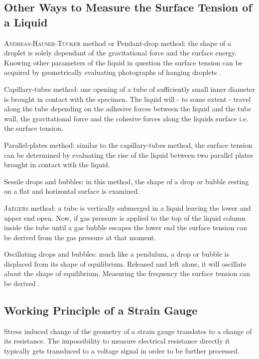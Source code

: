         \subsection*{Other Ways to Measure the Surface Tension of a Liquid}
            \textsc{Andreas-Hauser-Tucker} method or Pendant-drop method: the shape of a droplet is solely dependant of the
            gravitational force and the surface energy. Knowing other parameters of the liquid in question the surface tension
            can be acquired by geometrically evaluating photographs of hanging droplets \cite{Andreas-Hauser-Tucker.surface.tension.pendant.drop.1938}.\par
            Capillary-tubes method: one opening of a tube of sufficiently small inner diameter is brought in contact with
            the specimen. The liquid will - to some extent - travel along the tube depending on the adhesive forces between
            the liquid and the tube wall, the gravitational force and the cohesive forces along the liquids surface i.e.
            the surface tension.\par
            Parallel-plates method: similar to the capillary-tubes method, the surface tension can be determined by evaluating
            the rise of the liquid between two parallel plates brought in contact with the liquid.\par
            Sessile drops and bubbles: in this method, the shape of a drop or bubble resting on a flat and horizontal surface
            is examined.\par
            \textsc{Jaegers} method: a tube is vertically submerged in a liquid leaving the lower and upper end open. Now,
            if gas pressure is applied to the top of the liquid column inside the tube until a gas bubble escapes the lower
            end the surface tension can be derived from the gas pressure at that moment.\par
            Oscillating drops and bubbles: much like a pendulum, a drop or bubble is displaced from its shape of equilibrium.
            Released and left alone, it will oscillate about the shape of equilibrium. Measuring the frequency the surface
            tension can be derived \cite{oscillating.drops.surface.tension.Freer.2005}.
        \subsection*{Working Principle of a Strain Gauge}
            Stress induced change of the geometry of a strain gauge translates to a change of its resistance. The impossibility
            to measure electrical resistance directly it typically gets transduced to a voltage signal in order to be further
            processed.
